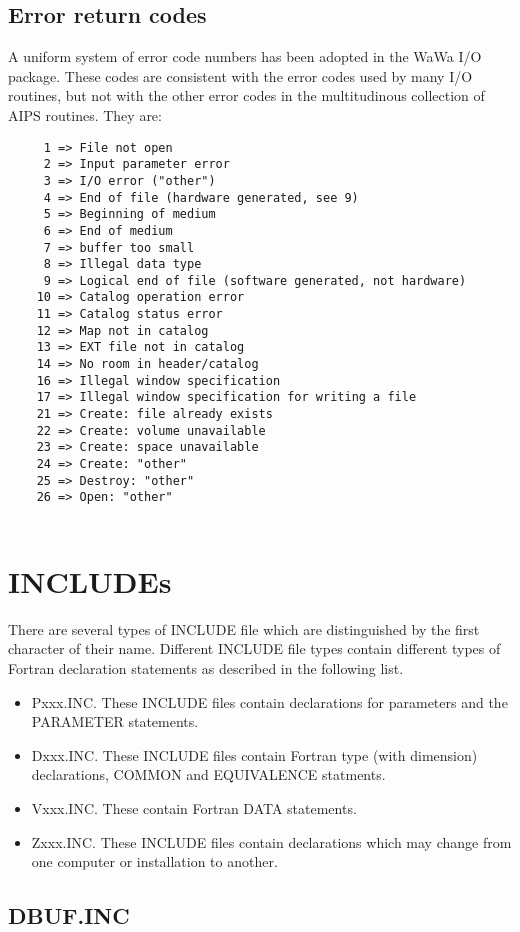\subsection{Error return codes}
A uniform system of error code numbers has been adopted in the WaWa
I/O package.  These codes are consistent with the error codes used by
many I/O routines, but not with the other error codes in the
multitudinous collection of AIPS routines.  They are:
\begin{verbatim}
     1 => File not open
     2 => Input parameter error
     3 => I/O error ("other")
     4 => End of file (hardware generated, see 9)
     5 => Beginning of medium
     6 => End of medium
     7 => buffer too small
     8 => Illegal data type
     9 => Logical end of file (software generated, not hardware)
    10 => Catalog operation error
    11 => Catalog status error
    12 => Map not in catalog
    13 => EXT file not in catalog
    14 => No room in header/catalog
    16 => Illegal window specification
    17 => Illegal window specification for writing a file
    21 => Create: file already exists
    22 => Create: volume unavailable
    23 => Create: space unavailable
    24 => Create: "other"
    25 => Destroy: "other"
    26 => Open: "other"


\end{verbatim}

\section{INCLUDEs}
There are several types of INCLUDE file which are distinguished by the
first character of their name.  Different INCLUDE file types contain
different types of Fortran declaration statements as described in the
following list.
\begin{itemize} %
\item Pxxx.INC.  These INCLUDE files contain declarations for parameters and
the PARAMETER statements.
\item Dxxx.INC.  These INCLUDE files contain Fortran type (with dimension)
declarations, COMMON and EQUIVALENCE statments.
\item Vxxx.INC.  These contain Fortran DATA statements.
\item Zxxx.INC.  These INCLUDE files contain declarations which may change
from one computer or installation to another.

\end{itemize} %
\subsection{DBUF.INC}

